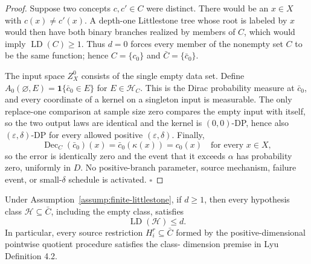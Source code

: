 \begin{proof}
Suppose two concepts \(c,c'\in C\) were distinct. There would be
an \(x\in X\) with \(c(x)\ne c'(x)\). A depth-one Littlestone tree whose
root is labeled by \(x\) would then have both binary branches realized by
members of \(C\), which would imply \(\operatorname{LD}(C)\ge1\). Thus
\(d=0\) forces every member of the nonempty set \(C\) to be the same
function; hence \(C=\{c_0\}\) and \(\bar C=\{\bar c_0\}\).

The input space \(Z_X^0\) consists of the single empty data set. Define
\(A_0(\varnothing,E)=\mathbf1\{\bar c_0\in E\}\) for
\(E\in\mathcal H_C\). This is the Dirac probability measure at
\(\bar c_0\), and every coordinate of a kernel on a singleton input is
measurable. The only replace-one comparison at sample size zero compares the
empty input with itself, so the two output laws are identical and the kernel
is \((0,0)\)-DP, hence also \((\varepsilon,\delta)\)-DP for every allowed
positive \((\varepsilon,\delta)\). Finally,
\[
\operatorname{Dec}_C(\bar c_0)(x)
=\bar c_0(\kappa(x))=c_0(x)
\quad\text{for every }x\in X,
\]
so the error is identically zero and the event that it exceeds \(\alpha\)
has probability zero, uniformly in \(D\). No positive-branch parameter,
source mechanism, failure event, or small-\(\delta\) schedule is activated.
\(\square\)


\end{proof}

\begin{lemma}\label{lem:step-001-quotient-ld}
Under Assumption~\ref{assump:finite-littlestone}, if \(d\ge1\), then every
hypothesis class \(\mathcal H\subseteq\bar C\), including the empty class,
satisfies
\[
\operatorname{LD}(\mathcal H)\le d.
\tag{QuotientLDBound}
\]
In particular, every source restriction \(H_i^r\subseteq\bar C\) formed by
the positive-dimensional pointwise quotient procedure satisfies the class-
dimension premise in Lyu~\citep{lyu2025} Definition 4.2.


\end{lemma}

